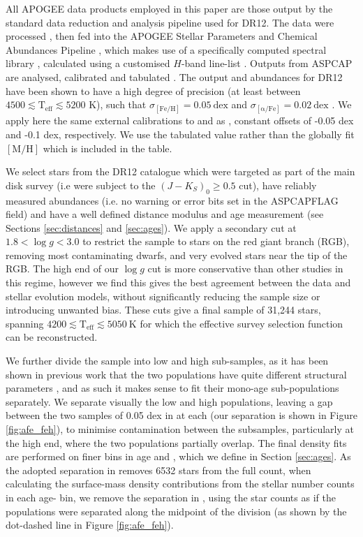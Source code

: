 All APOGEE data products employed in this paper are those output by the standard data reduction and analysis pipeline used for DR12. The data were processed \citep{2015AJ....150..173N}, then fed into the APOGEE Stellar Parameters and Chemical Abundances Pipeline \citep[ASPCAP,][]{2016AJ....151..144G}, which makes use of a specifically computed spectral library \citep{2015AJ....149..181Z}, calculated using a customised $H$-band line-list \citep{2015ApJS..221...24S}. Outputs from ASPCAP are analysed, calibrated and tabulated \citep{2015AJ....150..148H}. The output \afe{} and \feh{} abundances for DR12 have been shown to have a high degree of precision (at least between $4500 \lesssim \mathrm{T_{\mathrm{eff}}} \lesssim 5200$ K), such that $\sigma_{\mathrm{[Fe/H]}} = 0.05\ \mathrm{dex}$ and $\sigma_{\mathrm{[\alpha/Fe]}} = 0.02\ \mathrm{dex}$ \citep{2016ApJ...823...30B}. We apply here the same external calibrations to \afe{} and \feh{} as \citet{2016ApJ...823...30B}, constant offsets of -0.05 dex and -0.1 dex, respectively. We use the tabulated \feh{} value rather than the globally fit $\mathrm{[M/H]}$ which is included in the table.

We select stars from the DR12 catalogue which were targeted as part of the main disk survey (i.e were subject to the $(J-K_S)_0 \geq 0.5$ cut), have reliably measured abundances (i.e. no warning or error bits set in the ASPCAPFLAG field) and have a well defined distance modulus and age measurement (see Sections \ref{sec:distances} and \ref{sec:ages}). We apply a secondary cut at $1.8 < \log{g} < 3.0$ to restrict the sample to stars on the red giant branch (RGB), removing most contaminating dwarfs, and very evolved stars near the tip of the RGB. The high end of our $\log{g}$ cut is more conservative than other studies in this regime, however we find this gives the best agreement between the data and stellar evolution models, without significantly reducing the sample size or introducing unwanted bias. These cuts give a final sample of 31,244 stars, spanning $4200 \lesssim \mathrm{T_{\mathrm{eff}}} \lesssim  5050\ \mathrm{K}$ for which the effective survey selection function can be reconstructed.

We further divide the sample into low and high \afe{} sub-samples, as it has been shown in previous work that the two populations have quite different structural parameters \citep{2016ApJ...823...30B}, and as such it makes sense to fit their mono-age sub-populations separately. We separate visually the low and high \afe{} populations, leaving a gap between the two samples of 0.05 dex in \afe{} at each \feh{} (our separation is shown in Figure \ref{fig:afe_feh}), to minimise contamination between the subsamples, particularly at the high \feh{} end, where the two populations partially overlap. The final density fits are performed on finer bins in age and \feh{}, which we define in Section \ref{sec:ages}. As the adopted separation in \afe{} removes 6532 stars from the full count, when calculating the surface-mass density contributions from the stellar number counts in each age-\feh{} bin, we remove the separation in \afe{}, using the star counts as if the populations were separated along the midpoint of the division (as shown by the dot-dashed line in Figure \ref{fig:afe_feh}). 

